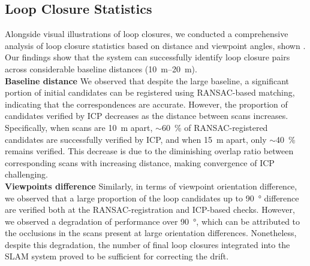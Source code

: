 \subsection*{Loop Closure Statistics}
Alongside visual illustrations of loop closures, we conducted a comprehensive analysis of loop closure statistics based on distance and viewpoint angles, shown . Our findings show that the system can successfully identify loop closure pairs across considerable baseline distances (\SIrange{10}{20}{\meter}). \\
\textbf{Baseline distance}\hspace{0.5em} We observed that despite the large baseline, a significant portion of initial candidates can be registered using RANSAC-based matching, indicating that the correspondences are accurate. However, the proportion of candidates verified by ICP decreases as the distance between scans increases. Specifically, when scans are \SI{10}{\meter} apart, $\sim$\SI{60}{\percent} of RANSAC-registered candidates are successfully verified by ICP, and when \SI{15}{\meter} apart, only $\sim$\SI{40}{\percent} remains verified. This decrease is due to the diminishing overlap ratio between corresponding scans with increasing distance, making convergence of ICP challenging. \\
\textbf{Viewpoints difference}\hspace{0.5em} Similarly, in terms of viewpoint orientation difference, we observed that a large proportion of the loop candidates up to \SI{90}{\degree} difference are verified both at the RANSAC-registration and ICP-based checks. However, we observed a degradation of performance over \SI{90}{\degree}, which can be attributed to the occlusions in the scans present at large orientation differences. Nonetheless, despite this degradation, the number of final loop closures integrated into the SLAM system proved to be sufficient for correcting the drift.   

